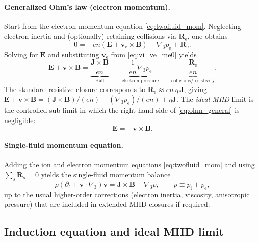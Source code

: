 \documentclass[11pt]{article}
\newcommand{\gradthree}{\nabla_3}
\newcommand{\ion}{\mathrm{i}}
\newcommand{\ele}{\mathrm{e}}
\newcommand{\E}{\mathbf{E}}
\newcommand{\B}{\mathbf{B}}
\newcommand{\Jb}{\mathbf{J}}
\newcommand{\rhob}{\rho}
\begin{document}
\paragraph{Generalized Ohm's law (electron momentum).}
Start from the electron momentum equation \eqref{eq:twofluid_mom}. Neglecting electron inertia
and (optionally) retaining collisions via \(\mathbf{R}_\ele\), one obtains
\begin{equation}
0
=
-e n\left(\E + \mathbf{v}_\ele\times\B\right) - \gradthree p_\ele + \mathbf{R}_\ele.
\label{eq:electron_momentum_inertialess}
\end{equation}
Solving for \(\E\) and substituting \(\mathbf{v}_\ele\) from \eqref{eq:vi_ve_me0} yields
\begin{equation}
\E + \mathbf{v}\times\B
=
\underbrace{\frac{\Jb\times\B}{e n}}_{\text{Hall}}
\;-\;
\underbrace{\frac{1}{e n}\gradthree p_\ele}_{\text{electron pressure}}
\;+\;
\underbrace{\frac{\mathbf{R}_\ele}{e n}}_{\text{collisions/resistivity}}.
\label{eq:ohm_general}
\end{equation}
The standard resistive closure corresponds to \(\mathbf{R}_\ele \approx e n\,\eta\,\Jb\),
giving \(\E + \mathbf{v}\times\B = (\Jb\times\B)/(en) - (\gradthree p_\ele)/(en) + \eta \Jb\).
The \emph{ideal MHD} limit is the controlled sub-limit in which the right-hand side of
\eqref{eq:ohm_general} is negligible:
\begin{equation}
\E = -\mathbf{v}\times\B.
\label{eq:ideal_ohm}
\end{equation}

\paragraph{Single-fluid momentum equation.}
Adding the ion and electron momentum equations \eqref{eq:twofluid_mom} and using
\(\sum_s \mathbf{R}_s=0\) yields the single-fluid momentum balance
\begin{equation}
\rhob\left(\partial_t + \mathbf{v}\cdot\gradthree\right)\mathbf{v}
=
\Jb\times\B - \gradthree p,
\qquad
p \equiv p_\ion + p_\ele,
\label{eq:mhd_momentum}
\end{equation}
up to the usual higher-order corrections (electron inertia, viscosity, anisotropic pressure)
that are included in extended-MHD closures if required.

\subsection{Induction equation and ideal MHD limit}
\label{sec:ideal_mhd}
\end{document}
